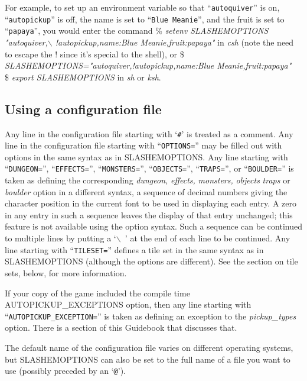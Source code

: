 For example, to set up an environment variable so that ``{\tt autoquiver}'' is on,
``{\tt autopickup}'' is off, the name is set to ``{\tt Blue Meanie}'', and the fruit
is set to ``{\tt papaya}'', you would enter the command
\% {\it setenv SLASHEMOPTIONS "autoquiver,$\backslash$ !autopickup,name:Blue Meanie,fruit:papaya"\/}
in {\it csh\/} (note the need to escape the ! since it's special to the shell), or
\$ {\it SLASHEMOPTIONS="autoquiver,!autopickup,name:Blue Meanie,fruit:papaya"\/}\\
\$ {\it export SLASHEMOPTIONS\/}
in {\it sh\/} or {\it ksh}.
\subsection*{Using a configuration file}


Any line in the configuration file starting with `{\tt \#}' is treated as a comment.
Any line in the configuration file starting with ``{\tt OPTIONS=}'' may be
filled out with options in the same syntax as in SLASHEMOPTIONS.
Any line starting with ``{\tt DUNGEON=}'', ``{\tt EFFECTS=}'', ``{\tt MONSTERS=}'',
``{\tt OBJECTS=}'', ``{\tt TRAPS=}'', or ``{\tt BOULDER=}''
is taken as defining the corresponding
{\it dungeon,\/} 
{\it effects,\/} 
{\it monsters,\/} 
{\it objects\/} 
{\it traps\/} 
or
{\it boulder\/} 
option in a different syntax,
a sequence of decimal numbers giving the character position
in the current font to be used in displaying each entry.
A zero in any entry in such a sequence leaves the display of that
entry unchanged; this feature is not available using the option syntax.
Such a sequence can be continued to multiple lines by putting a `{\tt $\backslash$ }'
at the end of each line to be continued.
Any line starting with ``{\tt TILESET=}'' defines a tile set in the same syntax
as in SLASHEMOPTIONS (although the options are different). See the
section on tile sets, below, for more information.

If your copy of the game included the compile time AUTOPICKUP\_EXCEPTIONS
option, then any line starting with ``{\tt AUTOPICKUP\_EXCEPTION=}'' is taken
as defining an exception to the 
{\it pickup_types\/} 
option. 
There is a section of this Guidebook that discusses that.

The default name of the configuration file varies on different
operating systems, but SLASHEMOPTIONS can also be set to
the full name of a file you want to use (possibly preceded by an `{\tt @}').
